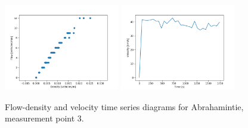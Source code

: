 \documentclass[english, 12pt, a4paper, elec, utf8, pdfa, online]{aaltothesis}
\begin{document}
\begin{figure}[ht!]
    \centering
    \includegraphics[width=0.45\textwidth]{graphs/Abrahamintie_3_flw_dns.png}
    \includegraphics[width=0.45\textwidth]{graphs/Abrahamintie_3_spd_time_6.png}
    \caption{Flow-density and velocity time series diagrams for Abrahamintie, measurement point 3.}
\end{figure}
\end{document}
